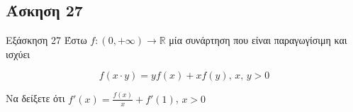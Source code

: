 \documentclass[greek]{beamer}
\begin{document}
\subsection{Άσκηση 27}
\begin{frame}[label=Άσκηση27]{Εξάσκηση 27}
  Έστω $f:(0,+\infty)\to\mathbb{R}$ μία συνάρτηση που είναι παραγωγίσιμη και ισχύει

  $$f(x\cdot y)=yf(x)+xf(y) \text{, } x \text{, } y>0$$

  Να δείξετε ότι $f'(x)=\frac{f(x)}{x}+f'(1)$, $x>0$

\end{frame}
%
%
%
%
%
%
%
\end{document}
